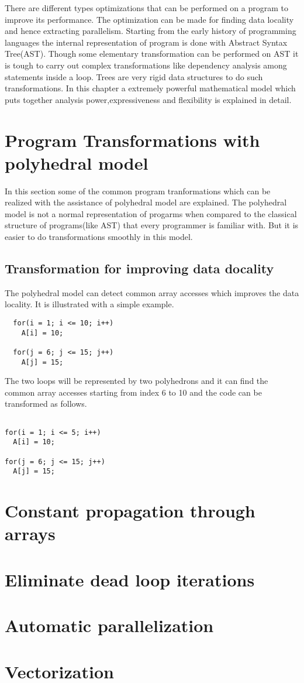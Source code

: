 \label{chap:background}

There are different types optimizations that can be performed on a program to improve its
performance. The optimization can be made for finding data locality and hence extracting
parallelism. Starting from the early history of programming languages the internal representation
of program is done with Abstract Syntax Tree(AST). Though some elementary transformation can
be performed on AST it is tough to carry out complex transformations like dependency analysis among
statements inside a loop. Trees are very rigid data structures to do such transformations.
In this chapter a extremely powerful mathematical model which puts together analysis power,expressiveness and flexibility is explained in detail.

\section{Program Transformations with polyhedral model}

In this section some of the common program tranformations which can be realized with the
assistance of polyhedral model are explained. The polyhedral model is not a normal representation of progarms when compared to the
classical structure of programs(like AST) that every programmer is familiar with. But
it is easier to do transformations smoothly in this model.

\subsection{Transformation for improving data docality}

The polyhedral model can detect common array accesses which improves the data locality. It is
illustrated with a simple example.
{\footnotesize
\begin{lstlisting}
  for(i = 1; i <= 10; i++)
    A[i] = 10;
  
  for(j = 6; j <= 15; j++)
    A[j] = 15;
\end{lstlisting}
}

The two loops will be represented by two polyhedrons and it can find the common 
array accesses starting from index 6 to 10 and the code can be transformed as follows.

{\footnotesize
\begin{lstlisting}

for(i = 1; i <= 5; i++)
  A[i] = 10;

for(j = 6; j <= 15; j++)
  A[j] = 15;
\end{lstlisting}
}

\section{Constant propagation through arrays}

\section{Eliminate dead loop iterations}
\section{Automatic parallelization}
\section{Vectorization}
